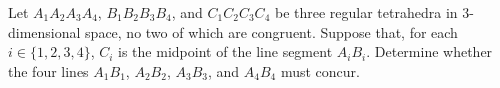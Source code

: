 Let $A_1A_2A_3A_4$, $B_1B_2B_3B_4$, and $C_1C_2C_3C_4$ be three regular tetrahedra in $3$-dimensional space, no two of which are congruent. Suppose that, for each $i\in \{1,2,3,4\}$, $C_i$ is the midpoint of the line segment $A_iB_i$. Determine whether the four lines $A_1B_1$, $A_2B_2$, $A_3B_3$, and $A_4B_4$ must concur.